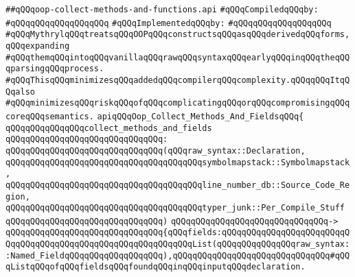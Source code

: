 \label{src/lib/compiler/front/typer/main/oop-collect-methods-and-fields.api}
\verb|##qQQqoop-collect-methods-and-functions.api|\newline
\newline
\verb|#qQQqCompiledqQQqby:|\newline
\verb|#qQQqqQQqqQQqqQQqqQQq|\newline
\newline
\verb|#qQQqImplementedqQQqby:|\newline
\verb|#qQQqqQQqqQQqqQQqqQQq|\newline
\newline
\verb|#qQQqMythrylqQQqtreatsqQQqOOPqQQqconstructsqQQqasqQQqderivedqQQqforms,qQQqexpanding|\newline
\verb|#qQQqthemqQQqintoqQQqvanillaqQQqrawqQQqsyntaxqQQqearlyqQQqinqQQqtheqQQqparsingqQQqprocess.|\newline
\verb|#qQQqThisqQQqminimizesqQQqaddedqQQqcompilerqQQqcomplexity.qQQqqQQqItqQQqalso|\newline
\verb|#qQQqminimizesqQQqriskqQQqofqQQqcomplicatingqQQqorqQQqcompromisingqQQqcoreqQQqsemantics.|\newline
\newline
\newline
\verb|apiqQQqOop_Collect_Methods_And_FieldsqQQq{|\newline
\newline
\verb|qQQqqQQqqQQqqQQqcollect_methods_and_fields|\newline
\verb|qQQqqQQqqQQqqQQqqQQqqQQqqQQqqQQq:|\newline
\verb|qQQqqQQqqQQqqQQqqQQqqQQqqQQqqQQq(qQQqraw_syntax::Declaration,|\newline
\verb|qQQqqQQqqQQqqQQqqQQqqQQqqQQqqQQqqQQqqQQqsymbolmapstack::Symbolmapstack,|\newline
\verb|qQQqqQQqqQQqqQQqqQQqqQQqqQQqqQQqqQQqqQQqline_number_db::Source_Code_Region,|\newline
\verb|qQQqqQQqqQQqqQQqqQQqqQQqqQQqqQQqqQQqqQQqtyper_junk::Per_Compile_Stuff|\newline
\verb|qQQqqQQqqQQqqQQqqQQqqQQqqQQqqQQq)|\newline
\verb|qQQqqQQqqQQqqQQqqQQqqQQqqQQqqQQq->|\newline
\verb|qQQqqQQqqQQqqQQqqQQqqQQqqQQqqQQq{qQQqfields:qQQqqQQqqQQqqQQqqQQqqQQqqQQqqQQqqQQqqQQqqQQqqQQqqQQqqQQqqQQqqQQqList(qQQqqQQqqQQqqQQqraw_syntax::Named_FieldqQQqqQQqqQQqqQQqqQQq),qQQqqQQqqQQqqQQqqQQqqQQqqQQqqQQq#qQQqListqQQqofqQQqfieldsqQQqfoundqQQqinqQQqinputqQQqdeclaration.|\newline
